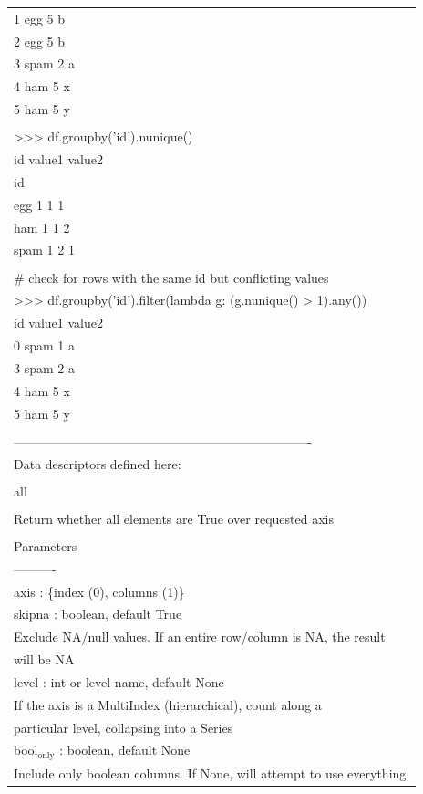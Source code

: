 \documentclass[11pt]{article}
\begin{document}
\begin{enumerate}
\begin{enumerate}
\begin{enumerate}
\begin{center}
\begin{tabular}{l}
1   egg       5      b\\
2   egg       5      b\\
3  spam       2      a\\
4   ham       5      x\\
5   ham       5      y\\
\\
>>> df.groupby('id').nunique()\\
id  value1  value2\\
id\\
egg    1       1       1\\
ham    1       1       2\\
spam   1       2       1\\
\\
\# check for rows with the same id but conflicting values\\
>>> df.groupby('id').filter(lambda g: (g.nunique() > 1).any())\\
id  value1 value2\\
0  spam       1      a\\
3  spam       2      a\\
4   ham       5      x\\
5   ham       5      y\\
\\
----------------------------------------------------------------------\\
Data descriptors defined here:\\
\\
all\\
\\
Return whether all elements are True over requested axis\\
\\
Parameters\\
----------\\
axis : \{index (0), columns (1)\}\\
skipna : boolean, default True\\
Exclude NA/null values. If an entire row/column is NA, the result\\
will be NA\\
level : int or level name, default None\\
If the axis is a MultiIndex (hierarchical), count along a\\
particular level, collapsing into a Series\\
bool\(_{\text{only}}\) : boolean, default None\\
Include only boolean columns. If None, will attempt to use everything,\\

\end{tabular}
\end{center}
\end{enumerate}
\end{enumerate}
\end{enumerate}
\end{document}
